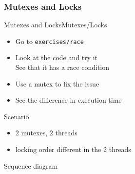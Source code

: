 \begin{frame}[fragile]
  \frametitle{Mutexes and Locks}
  \begin{exerciseWithShortcut}{Mutexes and Locks}{Mutexes/Locks}
    \begin{itemize}
    \item Go to \texttt{exercises/race}
    \item Look at the code and try it\\
      See that it has a race condition
    \item Use a mutex to fix the issue
    \item See the difference in execution time
    \end{itemize}
  \end{exerciseWithShortcut}
\end{frame}

\begin{frame}[fragile]
  \begin{block}{Scenario}
    \begin{itemize}
    \item 2 mutexes, 2 threads
    \item locking order different in the 2 threads
    \end{itemize}
  \end{block}
  \pause
  \begin{block}{Sequence diagram}
  \end{block}
\end{frame}

